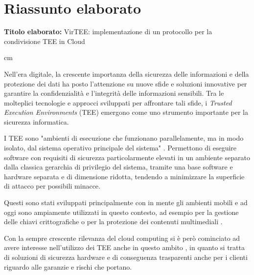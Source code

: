 \documentclass[12pt,italian]{report}
\begin{document}
	
	\chapter*{Riassunto elaborato}
	
	
	\textbf{Titolo elaborato:} VirTEE: implementazione di un protocollo per la condivisione TEE in Cloud
	
	 cm
	
	Nell'era digitale, la crescente importanza della sicurezza delle informazioni e della protezione dei dati ha posto l'attenzione su nuove sfide e soluzioni innovative per garantire la confidenzialità e l'integrità delle informazioni sensibili. Tra le molteplici tecnologie e approcci sviluppati per affrontare tali sfide, i \textit{Trusted Execution Environments} (TEE) emergono come uno strumento importante per la sicurezza informatica.
	
	I TEE sono "ambienti di esecuzione che funzionano parallelamente, ma in modo isolato, dal sistema operativo principale del sistema" \cite{gp2020systemarchitecture}. Permettono di eseguire software con requisiti di sicurezza particolarmente elevati in un ambiente separato dalla classica gerarchia di privilegio del sistema, tramite una base software e hardware separata e di dimensione ridotta, tendendo a minimizzare la superficie di attacco per possibili minacce.
	
	\medbreak
	
	Questi sono stati sviluppati principalmente con in mente gli ambienti mobili e ad oggi sono ampiamente utilizzati in questo contesto, ad esempio per la gestione delle chiavi crittografiche \cite{androidkeystore} o per la protezione dei contenuti multimediali \cite{widevine} \cite{playready}.
	
	Con la sempre crescente rilevanza del cloud computing si è però cominciato ad avere interesse nell'utilizzo dei TEE anche in questo ambito \cite{demigha2021hardware} \cite{dai2010tee}, in quanto si tratta di soluzioni di sicurezza hardware e di conseguenza trasparenti anche per i clienti riguardo alle garanzie e rischi che portano.
	
\end{document}

